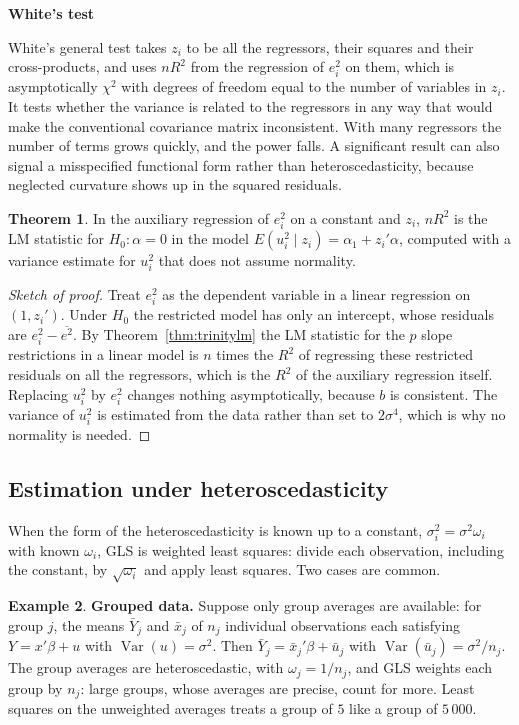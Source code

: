 \documentclass[11pt,a4paper]{article}
\numberwithin{equation}{section}
\DeclareMathOperator{\Var}{Var}
\theoremstyle{definition}
\newtheorem{thm}{Theorem}[subsection]
\newtheorem{exa}[thm]{Example}
\newcommand{\subhead}[1]{%
  \par\medskip\noindent\textbf{#1}\par\nobreak\smallskip}
\begin{document}
\subhead{White's test}
White's general test takes $z_i$ to be all the regressors, their squares and their cross-products, and uses $nR^2$ from the regression of $e_i^2$ on them, which
is asymptotically $\chi^2$ with degrees of freedom equal to the number of variables in $z_i$. It tests whether the variance is related to the regressors in any
way that would make the conventional covariance matrix inconsistent. With many regressors the number of terms grows quickly, and the power falls.
A significant result can also signal a misspecified functional form rather than heteroscedasticity, because neglected curvature shows up in the
squared residuals.

\begin{thm}
\label{thm:nr2}
In the auxiliary regression of $e_i^2$ on a constant and $z_i$, $nR^2$ is the LM statistic for $H_0\colon \alpha = 0$ in the model $E(u_i^2 \mid z_i) = \alpha_1 + z_i'\alpha$, computed with
a variance estimate for $u_i^2$ that does not assume normality.
\end{thm}

\begin{proof}[Sketch of proof]
Treat $e_i^2$ as the dependent variable in a linear regression on $(1, z_i')$. Under $H_0$ the restricted model has only an intercept, whose residuals are
$e_i^2 - \overline{e^2}$. By Theorem~\ref{thm:trinitylm} the LM statistic for the $p$ slope restrictions in a linear model is $n$ times the $R^2$ of regressing these
restricted residuals on all the regressors, which is the $R^2$ of the auxiliary regression itself. Replacing $u_i^2$ by $e_i^2$ changes nothing asymptotically,
because $b$ is consistent. The variance of $u_i^2$ is estimated from the data rather than set to $2\sigma^4$, which is why no normality is needed.
\end{proof}

\subsection{Estimation under heteroscedasticity}
\label{ssec:hetest}

When the form of the heteroscedasticity is known up to a constant, $\sigma_i^2 = \sigma^2\omega_i$ with known $\omega_i$, GLS is weighted least squares: divide each observation,
including the constant, by $\sqrt{\omega_i}$ and apply least squares. Two cases are common.

\begin{exa}
\label{ex:grouped}
\textbf{Grouped data.} Suppose only group averages are available: for group $j$, the means $\bar Y_j$ and $\bar x_j$ of $n_j$ individual observations each
satisfying $Y = x'\beta + u$ with $\Var(u) = \sigma^2$. Then $\bar Y_j = \bar x_j'\beta + \bar u_j$ with $\Var(\bar u_j) = \sigma^2/n_j$. The group averages are heteroscedastic,
with $\omega_j = 1/n_j$, and GLS weights each group by $n_j$: large groups, whose averages are precise, count for more. Least squares on the
unweighted averages treats a group of $5$ like a group of $5\,000$.
\end{exa}
\end{document}
